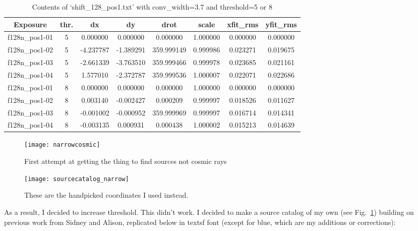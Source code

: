 \documentclass[11pt,obeyspaces]{article} %
\begin{document}
\begin{table}[b]
\caption{Contents of `shift\_128\_pos1.txt' with conv\_width=3.7 and threshold=5 or 8}
\begin{center}
\begin{tabular}{|c|c|c|c|c|c|c|c|} \hline
Exposure & thr. & dx & dy & drot & scale & xfit\_rms & yfit\_rms \\ \hline
f128n\_pos1-01 & 5 & 0.000000 & 0.000000 & 0.000000 & 1.000000 & 0.000000 & 0.000000  \\
f128n\_pos1-02 & 5 & -4.237787 & -1.389291  &  359.999149  &  0.999986  & 0.023271 & 0.019675 \\
f128n\_pos1-03 & 5 &  -2.661339 &  -3.763510 & 359.999466  &   0.999978 &  0.023685 & 0.021161\\
f128n\_pos1-04 & 5 & 1.577010 & -2.372787   & 359.999536   &  1.000007  & 0.022071 & 0.022686 \\ \hline
f128n\_pos1-01 & 8 & 0.000000 & 0.000000 & 0.000000 & 1.000000 & 0.000000 & 0.000000  \\
f128n\_pos1-02 & 8 &  0.003140 &  -0.002427 &   0.000209  &   0.999997 &  0.018526 & 0.011627  \\
f128n\_pos1-03 & 8 & -0.001002 & -0.000952  &  359.999969  &  0.999997 &  0.016714  & 0.014341\\
f128n\_pos1-04 & 8 &  -0.003135 & 0.000931  &  0.000438 &    1.000002 &  0.015213 & 0.014639
\\ \hline
\end{tabular}
\end{center}
\label{table:shift2}
\end{table}

\begin{figure}
\centering
\begin{minipage}[b]{.45\linewidth}
\texttt{[image: narrowcosmic]}
\caption{First attempt at getting the thing to find sources not cosmic rays}
\label{fig:narrowcosmic}
\end{minipage}
\quad
\begin{minipage}[b]{.45\linewidth}
\texttt{[image: sourcecatalog\_narrow]}
\caption{These are the handpicked coordinates I used instead.}
\label{fig:catalog}
\end{minipage}
\end{figure}

As a result, I decided to increase threshold. This didn't work. I decided to make a source catalog of my own (see Fig.~\ref{fig:catalog}) building on previous work from Sidney and Alison, replicated below in \textsf{textsf font} (except for blue, which are my additions or corrections):
\end{document}
